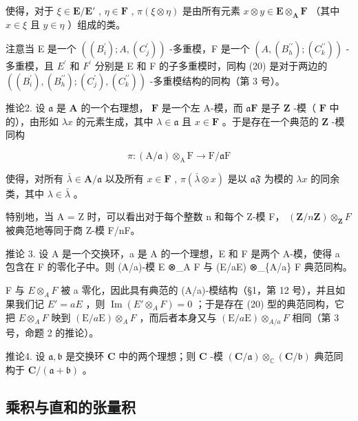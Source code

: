 使得，对于 \(\xi \in \mathbf{E} / \mathbf{E}'\) , \(\eta \in \mathbf{F}\) , \(\pi (\xi \otimes \eta)\) 是由所有元素 \(x \otimes y \in \mathbf{E} \otimes_{\mathbf{A}} \mathbf{F}\) （其中 \(x \in \xi\) 且 \(y \in \eta\) ）组成的类。

注意当 E 是一个 \(((B_{i}^{\prime}); A, (C_{j}^{\prime}))\) -多重模，F 是一个 \((A, (B_{h}^{\prime\prime}); (C_{k}^{\prime\prime}))\) -多重模，且 \(E^{\prime}\) 和 \(F^{\prime}\) 分别是 E 和 F 的子多重模时，同构 (20) 是对于两边的 \(((B_{i}^{\prime}), (B_{h}^{\prime\prime}); (C_{j}^{\prime}), (C_{k}^{\prime\prime}))\) -多重模结构的同构（第 3 号）。

推论2. 设 \(\mathfrak{a}\) 是 \(\mathbf{A}\) 的一个右理想， \(\mathbf{F}\) 是一个左 A-模，而 \(\mathfrak{a}\mathbf{F}\) 是子 \(\mathbf{Z}\) -模（ \(\mathbf{F}\) 中的），由形如 \(\lambda x\) 的元素生成，其中 \(\lambda \in \mathfrak{a}\) 且 \(x \in \mathbf{F}\) 。于是存在一个典范的 \(\mathbf{Z}\) -模同构

\[
\pi : (\mathrm{A} / \mathfrak {a}) \otimes_ {\mathrm{A}} \mathrm{F} \rightarrow \mathrm{F} / \mathfrak {a} \mathrm{F}\tag{21}
\]

使得，对所有 \(\bar{\lambda} \in \mathbf{A} / \mathfrak{a}\) 以及所有 \(x \in \mathbf{F}\) , \(\pi(\bar{\lambda} \otimes x)\) 是以 \(\mathfrak{aF}\) 为模的 \(\lambda x\) 的同余类，其中 \(\lambda \in \bar{\lambda}\) 。

特别地，当 A = Z 时，可以看出对于每个整数 n 和每个 Z-模 F， \((\mathbf{Z}/n\mathbf{Z}) \otimes_{\mathbf{Z}} F\) 被典范地等同于商 Z-模 F/nF。

推论 3. 设 A 是一个交换环，a 是 A 的一个理想，E 和 F 是两个 A-模，使得 a 包含在 F 的零化子中。则 (A/a)-模 E ⊗\_A F 与 (E/aE) ⊗\_\{A/a\} F 典范同构。

F 与 \(E \otimes_{A} F\) 被 a 零化，因此具有典范的 (A/a)-模结构（§1，第 12 号），并且如果我们记 \(E' = aE\) ，则 \(\operatorname{Im}(E' \otimes_{A} F) = 0\) ；于是存在 (20) 型的典范同构，它把 \(E \otimes_{A} F\) 映到 \((\mathrm{E}/a\mathrm{E}) \otimes_{A} F\) ，而后者本身又与 \((\mathrm{E}/a\mathrm{E}) \otimes_{A/a} F\) 相同（第 3 号，命题 2 的推论）。

推论4. 设 \(\mathfrak{a}, \mathfrak{b}\) 是交换环 \(\mathbf{C}\) 中的两个理想；则 \(\mathbf{C}\) -模 \((\mathbf{C} / \mathfrak{a}) \otimes_{\mathbb{C}} (\mathbf{C} / \mathfrak{b})\) 典范同构于 \(\mathbf{C}/(\mathfrak{a} + \mathfrak{b})\) 。

\subsection{乘积与直和的张量积}

